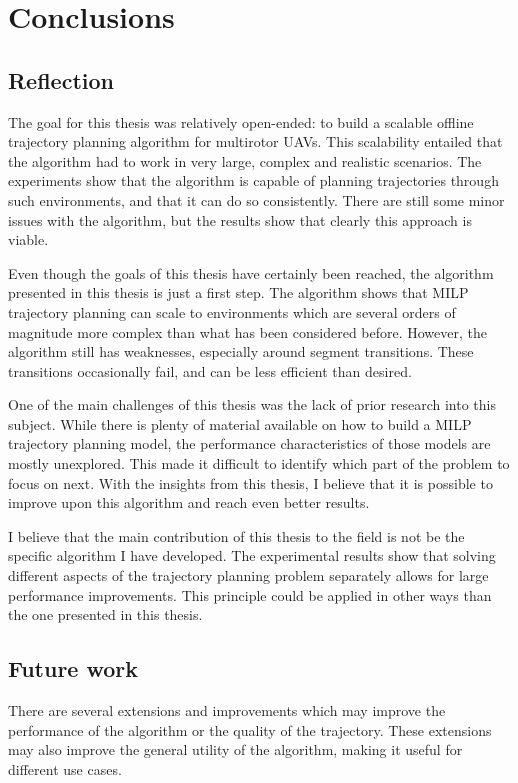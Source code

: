 

\chapter{Conclusions}
\label{section:conclusions}

\section{Reflection}
The goal for this thesis was relatively open-ended: to build a scalable offline trajectory planning algorithm for multirotor UAVs. This scalability entailed that the algorithm had to work in very large, complex and realistic scenarios. The experiments show that the algorithm is capable of planning trajectories through such environments, and that it can do so consistently. There are still some minor issues with the algorithm, but the results show that clearly this approach is viable.
\par
Even though the goals of this thesis have certainly been reached, the algorithm presented in this thesis is just a first step. The algorithm shows that MILP trajectory planning can scale to environments which are several orders of magnitude more complex than what has been considered before. However, the algorithm still has weaknesses, especially around segment transitions. These transitions occasionally fail, and can be less efficient than desired.
\par
One of the main challenges of this thesis was the lack of prior research into this subject. While there is plenty of material available on how to build a MILP trajectory planning model, the performance characteristics of those models are mostly unexplored. This made it difficult to identify which part of the problem to focus on next. With the insights from this thesis, I believe that it is possible to improve upon this algorithm and reach even better results.
\par
I believe that the main contribution of this thesis to the field is   not be the specific algorithm I have developed. The experimental results show that solving different aspects of the trajectory planning problem separately allows for large performance improvements. This principle could be applied in other ways than the one presented in this thesis.
\newpage
\section{Future work}
\label{section:future}
There are several extensions and improvements which may improve the performance of the algorithm or the quality of the trajectory. These extensions may also improve the general utility of the algorithm, making it useful for different use cases.

